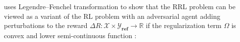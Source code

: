 


\citet{brekelmans2022your} uses Legendre–Fenchel transformation \citep{touchette2005legendre} to show that the RRL problem can be viewed as a variant of the RL problem with an adversarial agent adding perturbations to the reward $\Delta R: \mathcal{X} \times \mathcal{Y}_{\textbf{ref}}  \rightarrow \mathbb{R}$ if the regularization term $\Omega$ is convex and lower semi-continuous function \citep{boyd2004convex}:

